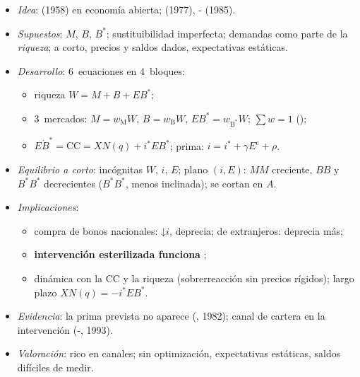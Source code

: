 \documentclass{article}
\begin{document}
\begin{columnas}
\begin{itemize}
\item \emph{Idea}:  (1958) en economía abierta;  (1977), - (1985).
\item \emph{Supuestos}: $M$, $B$, $B^*$; sustituibilidad imperfecta; demandas como parte de la \emph{riqueza}; a corto, precios y saldos dados, expectativas estáticas.
\item \emph{Desarrollo}: 6~ecuaciones en 4~bloques:
  \begin{itemize}
  \item riqueza $W=M+B+EB^*$;
  \item 3~mercados: $M=w_{\mathrm M}W$, $B=w_{\mathrm B}W$, $EB^*=w_{\mathrm B^*}W$; $\sum w=1$ ();
  \item $E\dot B^*=\mathrm{CC}=XN(q)+i^*EB^*$; prima: $i=i^*+\gamma E^e+\rho$.
  \end{itemize}
\item \emph{Equilibrio a corto}: incógnitas $W$, $i$, $E$; plano $(i,E)$: $MM$ creciente, $BB$ y $B^*B^*$ decrecientes ($B^*B^*$, menos inclinada); se cortan en $A$.
\end{itemize}
\begin{itemize}
\item \emph{Implicaciones}:
  \begin{itemize}
  \item compra de bonos nacionales: ↓$i$, deprecia; de extranjeros: deprecia más;
  \item \textbf{intervención esterilizada funciona} ;
  \item dinámica con la CC y la riqueza (sobrerreacción sin precios rígidos); largo plazo $XN(q)=-i^*EB^*$.
  \end{itemize}
\item \emph{Evidencia}: la prima prevista no aparece (, 1982); canal de cartera en la intervención (-, 1993).
\item \emph{Valoración}: rico en canales; sin optimización, expectativas estáticas, saldos difíciles de medir.
\end{itemize}


\end{columnas}
\end{document}
